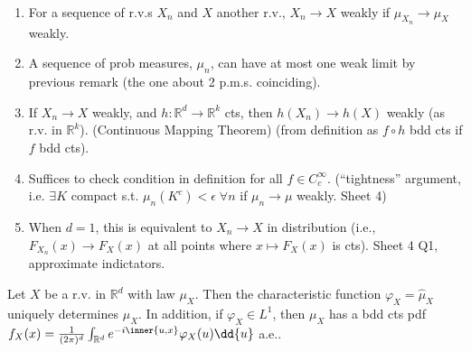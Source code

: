 \begin{remark} \
	\begin{enumerate}
		\item For a sequence of r.v.s $X_n$ and $X$ another r.v., $X_n \to X$ weakly if $\mu_{X_n} \to \mu_X$ weakly.
		\item A sequence of prob measures, $\mu_n$, can have at most one weak limit by previous remark (the one about 2 p.m.s. coinciding).
		\item If $X_n \to X$ weakly, and $h : \mathbb{R}^d \to \mathbb{R}^k$ cts, then $h(X_n) \to h(X)$ weakly (as r.v. in $\mathbb{R}^k$). (Continuous Mapping Theorem) (from definition as $f \circ h$ bdd cts if $f$ bdd cts).
		\item Suffices to check condition in definition for all $f \in C_c^\infty$. (``tightness'' argument, i.e. $\exists K$ compact s.t. $\mu_n(K^c) < \epsilon \; \forall n$ if $\mu_n \to \mu$ weakly. Sheet 4)
		\item When $d = 1$, this is equivalent to $X_n \to X$ in distribution (i.e., $F_{X_n}(x) \to F_X(x)$ at all points where $x \mapsto F_X(x)$ is cts). Sheet 4 Q1, approximate indictators.
	\end{enumerate}
\end{remark}

\begin{theorem}
	Let $X$ be a r.v. in $\mathbb R^d$ with law $\mu_X$.
	Then the characteristic function $\varphi_X = \hat \mu_X$ uniquely determines $\mu_X$.
	In addition, if $\varphi_X \in L^1$, then $\mu_X$ has a bdd cts pdf $f_X(x) = \frac{1}{(2\pi)^d} \int_{\mathbb R^d} e^{-i\inner{u,x}} \varphi_X(u) \dd{u}$ a.e..
\end{theorem}

